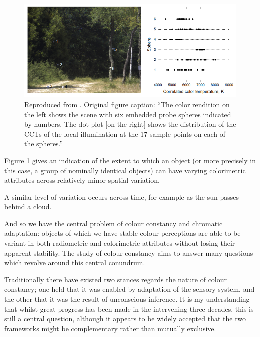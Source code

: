 \begin{figure}[htbp]
\includegraphics[max width=\textwidth]{figs/LitRev/greyballs.png}
\caption{Reproduced from \citet{nascimento_spatial_2014}. Original figure caption: ``The color rendition on the left shows the scene with six embedded probe spheres indicated by numbers. The dot plot [on the right] shows the distribution of the CCTs of the local illumination at the 17 sample points on each of the spheres.''}
\label{fig:greyballs}
\end{figure}

Figure \ref{fig:greyballs} gives an indication of the extent to which an object (or more precisely in this case, a group of nominally identical objects) can have varying colorimetric attributes across relatively minor spatial variation. 

A similar level of variation occurs across time, for example as the sun passes behind a cloud.

And so we have the central problem of colour constancy and chromatic adaptation: objects of which we have stable colour perceptions are able to be variant in both radiometric and colorimetric attributes without losing their apparent stability. The study of colour constancy aims to answer many questions which revolve around this central conundrum.

Traditionally %
there have existed two stances regards the nature of colour constancy; one held that it was enabled by adaptation of the sensory system, and the other that it was the result of unconscious inference. It is my understanding that whilst great progress has been made in the intervening three decades, this is still a central question, although it appears to be widely accepted that the two frameworks might be complementary rather than mutually exclusive. 

